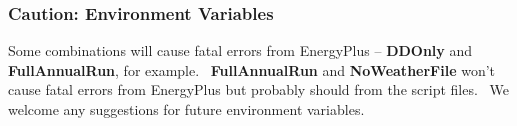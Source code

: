 \subsubsection{Caution: Environment Variables}\label{caution-environment-variables}

Some combinations will cause fatal errors from EnergyPlus -- \textbf{DDOnly} and \textbf{FullAnnualRun}, for example.~ \textbf{FullAnnualRun} and \textbf{NoWeatherFile} won't cause fatal errors from EnergyPlus but probably should from the script files.~ We welcome any suggestions for future environment variables.
